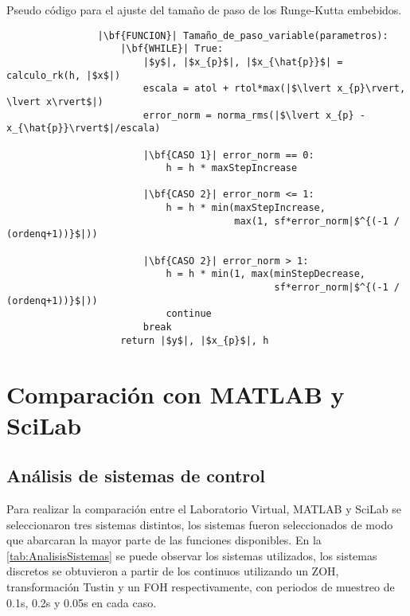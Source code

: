         \begin{longlisting}
            \caption[Pseudo código - Runge-Kutta embebidos]{Pseudo código para el ajuste del tamaño de paso de los Runge-Kutta embebidos.}
            \label{code:stepembebido}				
            \begin{verbatim}
                |\bf{FUNCION}| Tamaño_de_paso_variable(parametros):
                    |\bf{WHILE}| True:
                        |$y$|, |$x_{p}$|, |$x_{\hat{p}}$| = calculo_rk(h, |$x$|)
                        escala = atol + rtol*max(|$\lvert x_{p}\rvert, \lvert x\rvert$|)
                        error_norm = norma_rms(|$\lvert x_{p} - x_{\hat{p}}\rvert$|/escala)
                        
                        |\bf{CASO 1}| error_norm == 0:
                            h = h * maxStepIncrease
                        
                        |\bf{CASO 2}| error_norm <= 1:
                            h = h * min(maxStepIncrease,
                                        max(1, sf*error_norm|$^{(-1 / (ordenq+1))}$|))
                        
                        |\bf{CASO 2}| error_norm > 1:
                            h = h * min(1, max(minStepDecrease, 
                                               sf*error_norm|$^{(-1 / (ordenq+1))}$|))
                            continue
                        break
                    return |$y$|, |$x_{p}$|, h
            \end{verbatim}
        \end{longlisting}

\section{Comparación con MATLAB y SciLab}

    \subsection{Análisis de sistemas de control}
        
        Para realizar la comparación entre el Laboratorio Virtual, MATLAB y SciLab se seleccionaron tres sistemas distintos, los sistemas fueron seleccionados de modo que abarcaran la mayor parte de las funciones disponibles. En la \cref{tab:AnalisisSistemas} se puede observar los sistemas utilizados, los sistemas discretos se obtuvieron a partir de los continuos utilizando un ZOH, transformación Tustin y un FOH respectivamente, con periodos de muestreo de 0.1s, 0.2s y 0.05s en cada caso.    

